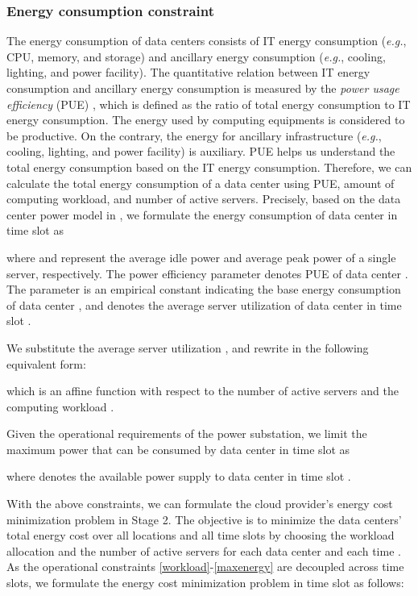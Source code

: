 \documentclass[journal]{IEEEtran}
\begin{document}
	
	\subsubsection{Energy consumption constraint}
	The energy consumption of data centers consists of IT energy consumption (\emph{e.g.}, CPU, memory, and storage) and ancillary energy consumption (\emph{e.g.}, cooling, lighting, and power facility). The quantitative relation between IT energy consumption and ancillary energy consumption is measured by the \textit{power usage efficiency} (PUE) \cite{pue}, which is defined as the ratio of total energy consumption to IT energy consumption. The energy used by computing equipments is considered to be productive. On the contrary, the energy for ancillary infrastructure (\emph{e.g.}, cooling, lighting, and power facility) is auxiliary. PUE helps us understand the total energy consumption based on the IT energy consumption. Therefore, we can calculate the total energy consumption of a data center using PUE, amount of computing workload, and number of active servers. Precisely, based on the data center power model in \cite{coordinate}, we formulate the energy consumption of data center  in time slot  as
	
	where  and  represent the average idle power and average peak power of a single server, respectively. The power efficiency parameter  denotes PUE of data center . The parameter  is an empirical constant indicating the base energy consumption of data center , and  denotes the average server utilization of data center  in time slot . 
	
	We substitute the average server utilization , and rewrite  in the following equivalent form:
	
	which is an affine function with respect to the number of active servers  and the computing workload .
		
	Given the operational requirements of the power substation, we limit the maximum power that can be consumed by data center  in time slot  as
	
	where  denotes the available power supply to data center  in time slot .
	
	With the above constraints, we can formulate the cloud provider's energy cost minimization problem in Stage 2. The objective is to minimize the data centers' total energy cost over all locations and all time slots by choosing the workload allocation  and the number of active servers  for each data center  and each time . As the operational constraints \eqref{workload}-\eqref{maxenergy} are decoupled across time slots, we formulate the energy cost minimization problem in time slot  as follows:
	
\end{document}
